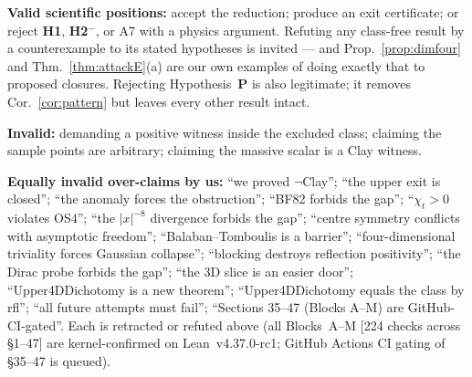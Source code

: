 \documentclass[11pt,a4paper]{article}
\theoremstyle{plain}
\theoremstyle{definition}
\theoremstyle{remark}
\newcommand{\OS}{\mathrm{OS}}\newcommand{\Gap}{\mathrm{Gap}}
\newcommand{\Chit}{\chi_t}
\renewcommand{\_}{\oldunderscore\allowbreak}
\begin{document}
\textbf{Valid scientific positions:} accept the reduction; produce an exit certificate; or
reject \textbf{H1}, \textbf{H2$^-$}, or A7 with a physics argument. Refuting any class-free
result by a counterexample to its stated hypotheses is invited --- and
Prop.~\ref{prop:dimfour} and Thm.~\ref{thm:attackE}(a) are our own examples of doing exactly that
to proposed closures. Rejecting Hypothesis~\textbf{P} is also legitimate; it removes
Cor.~\ref{cor:pattern} but leaves every other result intact.

\textbf{Invalid:} demanding a positive witness inside the excluded class; claiming the sample
points are arbitrary; claiming the massive scalar is a Clay witness.

\textbf{Equally invalid over-claims by us:} ``we proved $\neg$Clay''; ``the upper exit is
closed''; ``the anomaly forces the obstruction''; ``BF82 forbids the gap''; ``$\Chit>0$ violates
$\OS4$''; ``the $|x|^{-8}$ divergence forbids the gap''; ``centre symmetry conflicts with
asymptotic freedom''; ``Balaban--Tomboulis is a barrier''; ``four-dimensional triviality forces
Gaussian collapse''; ``blocking destroys reflection positivity''; ``the Dirac probe forbids the
gap''; ``the 3D slice is an easier door''; ``Upper4DDichotomy is a new theorem'';
``Upper4DDichotomy equals the class by rfl''; ``all future attempts must fail'';
``Sections 35--47 (Blocks A--M) are GitHub-CI-gated''. Each is retracted or refuted above (all Blocks~A--M [224 checks across \S1--47] are kernel-confirmed on Lean~v4.37.0-rc1; GitHub Actions CI gating of \S35--47 is queued).
\end{document}
